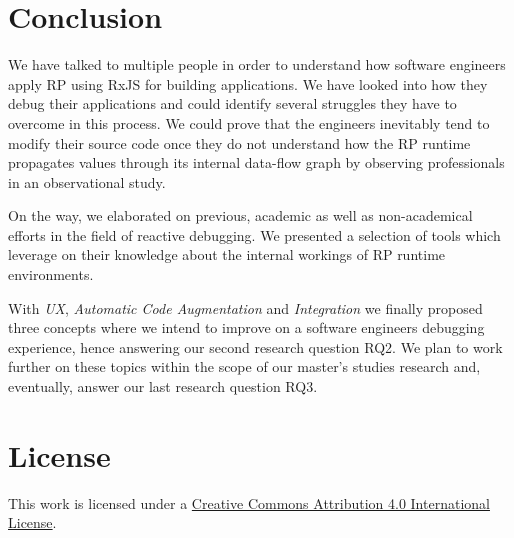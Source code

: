 \documentclass[12pt,a4paper]{article}
\begin{document}
\section{Conclusion}
\label{sec:conclusion}

We have talked to multiple people in order to understand how software engineers apply RP using RxJS for building applications. We have looked into how they debug their applications and could identify several struggles they have to overcome in this process. We could prove that the engineers inevitably tend to modify their source code once they do not understand how the RP runtime propagates values through its internal data-flow graph by observing professionals in an observational study.

On the way, we elaborated on previous, academic as well as non-academical efforts in the field of reactive debugging. We presented a selection of tools which leverage on their knowledge about the internal workings of RP runtime environments.

With \emph{UX}, \emph{Automatic Code Augmentation} and \emph{Integration} we finally proposed three concepts where we intend to improve on a software engineers debugging experience, hence answering our second research question RQ2. We plan to work further on these topics within the scope of our master's studies research and, eventually, answer our last research question RQ3.





\section*{License}
\ccby\thinspace\thinspace This work is licensed under a \href{https://creativecommons.org/licenses/by/4.0/}{Creative Commons Attribution 4.0 International License}.
\end{document}
